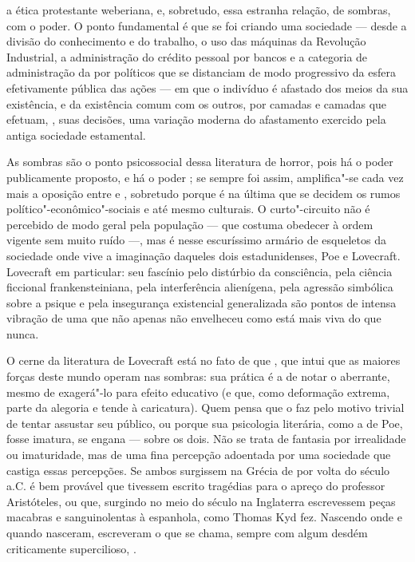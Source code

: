 \begin{multicols}{2}
\bigskip

{\small{}}

\bigskip

\noindent{}a ética protestante weberiana, e, sobretudo, essa estranha relação, de sombras, com o
poder. O ponto fundamental é que se foi criando uma sociedade --- desde
a divisão do conhecimento e do trabalho, o uso das máquinas da Revolução
Industrial, a administração do crédito pessoal por bancos e a categoria
de administração da {} por políticos que se distanciam
de modo progressivo da esfera efetivamente pública das ações --- em que
o indivíduo é afastado dos meios da sua existência, e da existência
comum com os outros, por camadas e camadas que efetuam, {}, suas decisões, uma variação moderna do
afastamento exercido pela antiga sociedade estamental.


As sombras são o ponto psicossocial dessa literatura de horror, pois há o poder publicamente proposto, e há o
poder {}; se sempre foi assim, amplifica"-se cada vez mais a oposição entre
{} e {}, sobretudo porque é
na última que se decidem os rumos político"-econômico"-sociais e até mesmo
culturais. O curto"-circuito não é percebido de modo geral pela população
--- que costuma obedecer à ordem vigente sem muito ruído ---, mas é
nesse escuríssimo armário de esqueletos da sociedade onde vive a
imaginação daqueles dois estadunidenses, Poe e Lovecraft. Lovecraft em
particular: seu fascínio pelo distúrbio da consciência, pela ciência
ficcional frankensteiniana, pela interferência alienígena, pela agressão
simbólica sobre a psique e pela insegurança existencial generalizada são
pontos de intensa vibração de uma {} que não apenas não
envelheceu como está mais viva do que nunca.

O cerne da literatura de Lovecraft está no fato de que {},
que intui que as maiores forças deste mundo operam nas sombras: sua prática é a de
notar o aberrante, mesmo de exagerá"-lo para efeito educativo (e que,
como deformação extrema, parte da alegoria e tende à caricatura). Quem
pensa que o faz pelo motivo trivial de tentar assustar seu público, ou
porque sua psicologia literária, como a de Poe, fosse imatura, se engana
--- sobre os dois. Não se trata de fantasia por irrealidade ou
imaturidade, mas de uma fina percepção adoentada por uma sociedade que
castiga essas percepções. Se ambos surgissem na Grécia de por volta do
século  a.C. é bem provável que tivessem escrito tragédias para o
apreço do professor Aristóteles, ou que, surgindo no meio do século 
na Inglaterra escrevessem peças macabras e sanguinolentas à espanhola,
como Thomas Kyd fez. Nascendo onde e quando nasceram, escreveram o que
se chama, sempre com algum desdém criticamente supercilioso,
{}.


\end{multicols}
